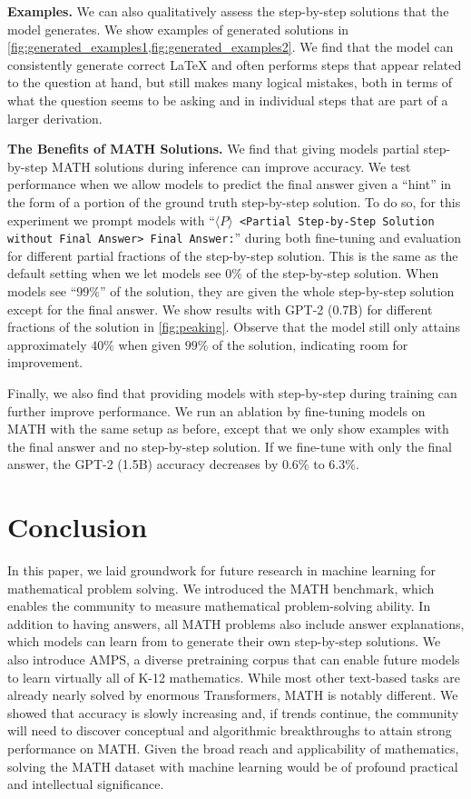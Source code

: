 \textbf{Examples.}\quad
We can also qualitatively assess the step-by-step solutions that the model generates. We show examples of generated solutions in \ref{fig:generated_examples1,fig:generated_examples2}.
We find that the model can consistently generate correct \LaTeX{} and often performs steps that appear related to the question at hand, but still makes many logical mistakes, both in terms of what the question seems to be asking and in individual steps that are part of a larger derivation. 

\textbf{The Benefits of MATH Solutions.}\quad
We find that giving models partial step-by-step MATH solutions during inference can improve accuracy. We test performance when we allow models to predict the final answer given a ``hint'' in the form of a portion of the ground truth step-by-step solution. To do so, for this experiment we prompt models with ``\texttt{$\langle P\rangle$ <Partial Step-by-Step Solution without Final Answer> Final Answer:}'' during both fine-tuning and evaluation for different partial fractions of the step-by-step solution. This is the same as the default setting when we let models see $0\%$ of the step-by-step solution. When models see ``$99\%$'' of the solution, they are given the whole step-by-step solution except for the final answer. We show results with GPT-2 (0.7B) for different fractions of the solution in \ref{fig:peaking}. Observe that the model still only attains approximately $40\%$ when given $99\%$ of the solution, indicating room for improvement.

Finally, we also find that providing models with step-by-step during training can further improve performance. We run an ablation by fine-tuning models on MATH with the same setup as before, except that we only show examples with the final answer and no step-by-step solution. If we fine-tune with only the final answer, the GPT-2 (1.5B) accuracy decreases by $0.6\%$ to $6.3\%$.

\section{Conclusion}
In this paper, we laid groundwork for future research in machine learning for mathematical problem solving. We introduced the MATH benchmark, which enables the community to measure mathematical problem-solving ability. In addition to having answers, all MATH problems also include answer explanations, which models can learn from to generate their own step-by-step solutions. We also introduce AMPS, a diverse pretraining corpus that can enable future models to learn virtually all of K-12 mathematics. While most other text-based tasks are already nearly solved by enormous Transformers, MATH is notably different. We showed that accuracy is slowly increasing and, if trends continue, the community will need to discover conceptual and algorithmic breakthroughs to attain strong performance on MATH. Given the broad reach and applicability of mathematics, solving the MATH dataset with machine learning would be of profound practical and intellectual significance.


